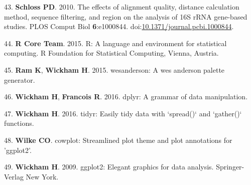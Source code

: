 \documentclass[11pt,]{article}
\begin{document}
\hypertarget{ref-Schloss2010}{}
43. \textbf{Schloss PD}. 2010. The effects of alignment quality,
distance calculation method, sequence filtering, and region on the
analysis of 16S rRNA gene-based studies. PLOS Comput Biol
\textbf{6}:e1000844.
doi:\href{https://doi.org/10.1371/journal.pcbi.1000844}{10.1371/journal.pcbi.1000844}.

\hypertarget{ref-language2015}{}
44. \textbf{R Core Team}. 2015. R: A language and environment for
statistical computing. R Foundation for Statistical Computing, Vienna,
Austria.

\hypertarget{ref-wesanderson}{}
45. \textbf{Ram K}, \textbf{Wickham H}. 2015. wesanderson: A wes
anderson palette generator.

\hypertarget{ref-dplyr}{}
46. \textbf{Wickham H}, \textbf{Francois R}. 2016. dplyr: A grammar of
data manipulation.

\hypertarget{ref-tidyr}{}
47. \textbf{Wickham H}. 2016. tidyr: Easily tidy data with `spread()`
and `gather()` functions.

\hypertarget{ref-cowplot}{}
48. \textbf{Wilke CO}. cowplot: Streamlined plot theme and plot
annotations for 'ggplot2'.

\hypertarget{ref-ggplot2}{}
49. \textbf{Wickham H}. 2009. ggplot2: Elegant graphics for data
analysis. Springer-Verlag New York.
\end{document}
